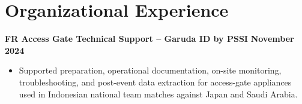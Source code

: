 \section*{Organizational Experience}

\begin{jobentry}
	\textbf{FR Access Gate Technical Support -- Garuda ID by PSSI} \hfill \textbf{November 2024}
	\begin{itemize}
		\item Supported preparation, operational documentation, on-site monitoring, troubleshooting, and post-event data extraction for access-gate appliances used in Indonesian national team matches against Japan and Saudi Arabia.
	\end{itemize}
\end{jobentry}
